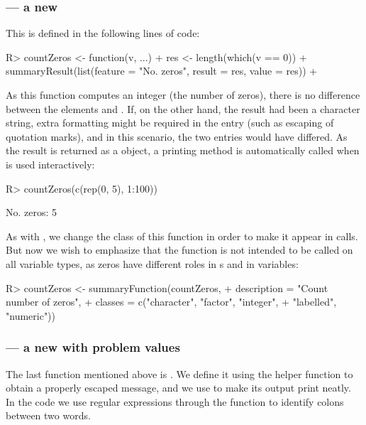 \documentclass[article,shortnames]{jss}
\begin{document}
\subsubsection[countZeros --- a new summaryFunction]{ --- a new }
This  is defined in the following lines of code:

\begin{Schunk}
\begin{Sinput}
R> countZeros <- function(v, ...) {
+    res <- length(which(v == 0))
+    summaryResult(list(feature = "No. zeros", result = res, value = res))
+  }
\end{Sinput}
\end{Schunk}

As this function computes an integer (the number of zeros),
there is no difference between the elements  and
. If, on the other hand, the result had been a character
string, extra formatting might be required in the  entry
(such as escaping of quotation marks), and in this scenario, the two
entries would have differed. As the result is returned as a
 object, a printing method is automatically called
when  is used interactively:

\begin{Schunk}
\begin{Sinput}
R> countZeros(c(rep(0, 5), 1:100))
\end{Sinput}
\begin{Soutput}
No. zeros: 5
\end{Soutput}
\end{Schunk}

As with , we change the class of this function in
order to make it appear in  calls. But now we
wish to emphasize that the function is not intended to be called on
all variable types, as zeros have different roles in s and in
 variables:

\begin{Schunk}
\begin{Sinput}
R> countZeros <- summaryFunction(countZeros,
+    description = "Count number of zeros",
+    classes = c("character", "factor", "integer",
+    "labelled", "numeric"))
\end{Sinput}
\end{Schunk}

\subsubsection[identifyColons --- a new checkFunction with problem values]{ --- a new  with problem values}
The last function mentioned above is . We
define it using the helper function  to
obtain a properly escaped message, and we use  to
make its output print neatly. In the code we use regular expressions
through the  function to identify colons between two
words.
\end{document}
